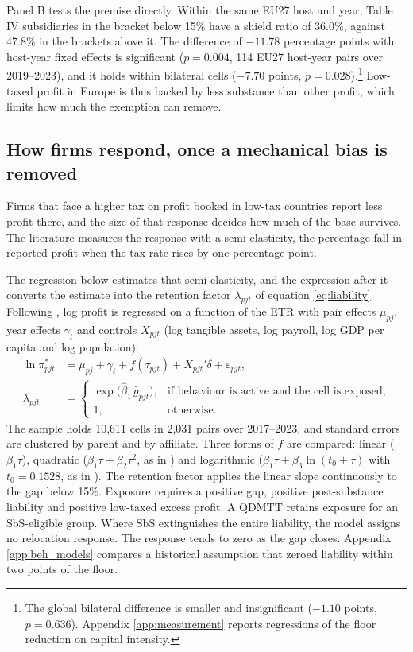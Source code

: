 \documentclass[11pt,a4paper]{article}
\begin{document}
Panel B tests the premise directly. Within the same EU27 host and year, Table IV subsidiaries in the bracket below 15\% have a shield ratio of 36.0\%, against 47.8\% in the brackets above it. The difference of $-11.78$ percentage points with host-year fixed effects is significant ($p=0.004$, 114 EU27 host-year pairs over 2019–2023), and it holds within bilateral cells ($-7.70$ points, $p=0.028$).\footnote{The global bilateral difference is smaller and insignificant ($-1.10$ points, $p=0.636$). Appendix \ref{app:measurement} reports regressions of the floor reduction on capital intensity.} Low-taxed profit in Europe is thus backed by less substance than other profit, which limits how much the exemption can remove.

\subsection{How firms respond, once a mechanical bias is removed}\label{sec:behaviour}

Firms that face a higher tax on profit booked in low-tax countries report less profit there, and the size of that response decides how much of the base survives. The literature measures the response with a semi-elasticity, the percentage fall in reported profit when the tax rate rises by one percentage point.

The regression below estimates that semi-elasticity, and the expression after it converts the estimate into the retention factor $\lambda_{pjt}$ of equation \eqref{eq:liability}. Following \citet{hines1994}, log profit is regressed on a function of the ETR with pair effects $\mu_{pj}$, year effects $\gamma_t$ and controls $X_{pjt}$ (log tangible assets, log payroll, log GDP per capita and log population):
\begin{equation}\label{eq:hinesrice}
\begin{aligned}
\ln\pi^{*}_{pjt}&=\mu_{pj}+\gamma_t+f(\tau_{pjt})+X_{pjt}'\delta+\varepsilon_{pjt},\\
\lambda_{pjt}&=
\begin{cases}
\exp\bigl(\hat\beta_1\,\bar g_{pjt}\bigr),
  & \text{if behaviour is active and the cell is exposed},\\
1, & \text{otherwise}.
\end{cases}
\end{aligned}
\end{equation}
The sample holds 10,611 cells in 2,031 pairs over 2017–2023, and standard errors are clustered by parent and by affiliate. Three forms of $f$ are compared: linear ($\beta_1\tau$), quadratic ($\beta_1\tau+\beta_2\tau^2$, as in \citealp{dowd2017}) and logarithmic ($\beta_1\tau+\beta_3\ln(t_0+\tau)$ with $t_0=0.1528$, as in \citealp{garcia-bernardo2024}). The retention factor applies the linear slope continuously to the gap below 15\%. Exposure requires a positive gap, positive post-substance liability and positive low-taxed excess profit. A QDMTT retains exposure for an SbS-eligible group. Where SbS extinguishes the entire liability, the model assigns no relocation response. The response tends to zero as the gap closes. Appendix \ref{app:beh_models} compares a historical assumption that zeroed liability within two points of the floor.
\end{document}
